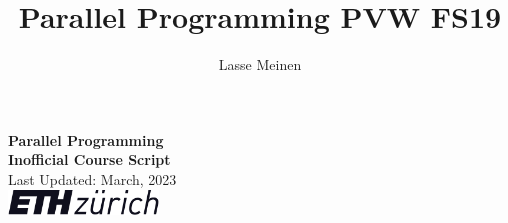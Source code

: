 \documentclass[titlepage, dvipsnames]{article}
\title{Parallel Programming PVW FS19}
\author{Lasse Meinen}
\theoremstyle{plain}
\theoremstyle{remark}
\theoremstyle{definition}
\begin{document}
    \renewcommand{\figurename}{Fig.}
    \renewcommand{\contentsname}{Table of Contents}
    \renewcommand{\thesubfigure}{\roman{subfigure}}

    \renewcommand{\ExerciseHeaderTitle}{\ExerciseTitle}
    \renewcommand{\ExerciseHeader}{\centerline{\textbf{\large\ExerciseName\ExerciseHeaderNB\ExerciseHeaderTitle\ExerciseHeaderOrigin}}\\}
    \renewcommand{\ExerciseListHeader}{\ExerciseHeaderDifficulty%
    \textbf{\ExerciseHeaderNB .%
    \ \ExerciseHeaderTitle \newline}%
    \ExerciseHeaderOrigin\ignorespaces}
    \renewcommand{\AnswerListHeader}{\textbf{\ExerciseHeaderNB. \ \ExerciseHeaderTitle}}
    \setlength{\Exesep}{1\baselineskip}
    \setlength{\QuestionBefore}{.2em}
    \setlength{\QuestionIndent}{2em}

    \makeatletter
        \begin{titlepage}
		\begin{center}
		\huge \textbf{Parallel Programming \\ Inofficial Course Script}
		\\ \bigskip
		\Large Last Updated: March, 2023
		\\ \bigskip
		\vfill
		{\includegraphics[width = 0.3\textwidth]{images/ETH.png}}
		\vfill
		\end{center}

	\end{titlepage}
    \makeatother
    \thispagestyle{empty}
    \newpage

    \setcounter{page}{1} %

    \tableofcontents
    \newpage
    
    \newpage
    
    \newpage
    
\end{document}
